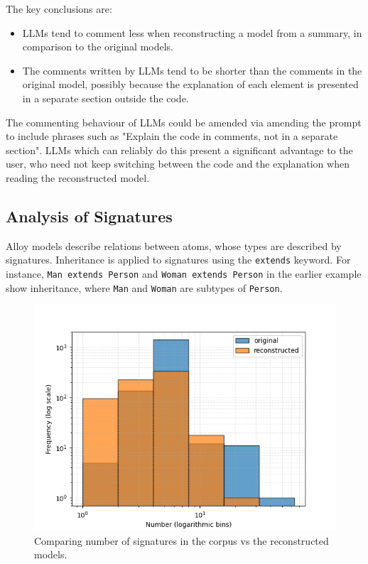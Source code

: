 \documentclass[conference]{IEEEtran}
\begin{document}
The key conclusions are:
\begin{itemize}
    \item LLMs tend to comment less when reconstructing a model from a summary, in comparison to the original models.
    \item The comments written by LLMs tend to be shorter than the comments in the original model, possibly because the explanation of each element is presented in a separate section outside the code.
\end{itemize}

The commenting behaviour of LLMs could be amended via amending the prompt to include phrases such as "Explain the code in comments, not in a separate section". LLMs which can reliably do this present a significant advantage to the user, who need not keep switching between the code and the explanation when reading the reconstructed model.

\subsection{Analysis of Signatures}

Alloy models describe relations between atoms, whose types are described by signatures. Inheritance is applied to signatures using the \verb|extends| keyword. For instance, \verb|Man extends Person| and \verb|Woman extends Person| in the earlier example show inheritance, where \verb|Man| and \verb|Woman| are subtypes of \verb|Person|.

\begin{figure}[htbp]
    \centerline{\includegraphics[width=\linewidth]{"./Comparing number of signatures in the corpus vs the reconstructed models.png"}}
    \caption{Comparing number of signatures in the corpus vs the reconstructed models.}
    \label{fig}
    \end{figure}
    
\end{document}
